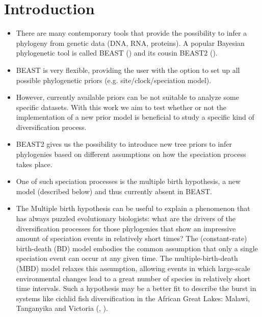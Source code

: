 \documentclass{article}
\begin{document}
\section{Introduction}
\begin{itemize}

\item There are many contemporary tools that provide the possibility 
to infer a phylogeny from genetic data (DNA, RNA, proteins). 
A popular Bayesian phylogenetic tool is called BEAST (\cite{beast}) 
and its cousin BEAST2 (\cite{beast2}).

\item BEAST is very flexible, providing the user with the option 
to set up all possible phylogenetic priors (e.g. site/clock/speciation model).

\item However, currently available priors can be not suitable 
to analyze some specific datasets. 
With this work we aim to test whether or not 
the implementation of a new prior model 
is beneficial to study a specific kind of diversification process.

\item BEAST2 gives us the possibility to introduce new tree priors 
to infer phylogenies based on different assumptions 
on how the speciation process takes place.

\item One of such speciation processes is the multiple birth hypothesis,
a new model (described below) and thus currently absent in BEAST.

\item The Multiple birth hypothesis can be useful to explain a phenomenon 
that has always puzzled evolutionary biologists: 
what are the drivers of the diversification processes 
for those phylogenies that show an impressive amount of speciation events 
in relatively short times? 
The (constant-rate) birth-death (BD) model embodies the common assumption that 
only a single speciation event can occur at any given time.
The multiple-birth-death (MBD) model 
relaxes this assumption, allowing events in which 
large-scale environmental changes lead to a great number of species 
in relatively short time intervals. 
Such a hypothesis may be a better fit to describe the burst in systems 
like cichlid fish diversification in the 
African Great Lakes: Malawi, Tanganyika and Victoria 
(\cite{janzen2016}, \cite{janzen2017}).


\end{itemize}
\end{document}
